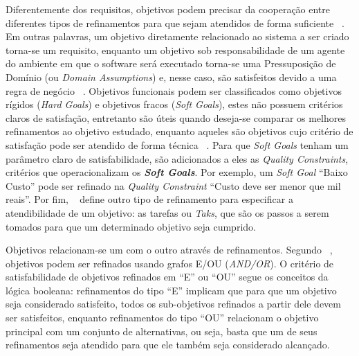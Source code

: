 Diferentemente dos requisitos, objetivos podem precisar da cooperação entre diferentes tipos de refinamentos para que sejam atendidos de forma suficiente ~\cite{dardenne1993goal}. Em outras palavras, um objetivo diretamente relacionado ao sistema a ser criado torna-se um requisito, enquanto um objetivo sob responsabilidade de um agente do ambiente em que o software será executado torna-se uma Pressuposição de Domínio (ou \textit{Domain Assumptions}) e, nesse caso, são satisfeitos devido a uma regra de negócio ~\cite{van2001goal, van1998managing}. Objetivos funcionais podem ser classificados como objetivos rígidos (\textit{Hard Goals}) e objetivos fracos (\textit{Soft Goals}), estes não possuem critérios claros de satisfação, entretanto são úteis quando deseja-se comparar os melhores refinamentos ao objetivo estudado, enquanto aqueles são objetivos cujo critério de satisfação pode ser atendido de forma técnica ~\cite{dardenne1993goal}. Para que \textit{Soft Goals} tenham um parâmetro claro de satisfabilidade, são adicionados a eles as \textit{Quality Constraints}, critérios que operacionalizam os \textit{\textbf{Soft Goals}}. Por exemplo, um \textit{Soft Goal} ``Baixo Custo'' pode ser refinado na \textit{Quality Constraint} ``Custo deve ser menor que mil reais''. Por fim, ~\cite{jureta2008revisiting} define outro tipo de refinamento para especificar a atendibilidade de um objetivo: as tarefas ou \textit{Taks}, que são os passos a serem tomados para que um determinado objetivo seja cumprido. 

Objetivos relacionam-se um com o outro através de refinamentos. Segundo ~\cite{dardenne1991goal, dardenne1993goal}, objetivos podem ser refinados usando grafos E/OU (\textit{AND/OR}). O critério de satisfabilidade de objetivos refinados em ``E'' ou ``OU'' segue os conceitos da lógica booleana: refinamentos do tipo ``E'' implicam que para que um objetivo seja considerado satisfeito, todos os sub-objetivos refinados a partir dele devem ser satisfeitos, enquanto refinamentos do tipo ``OU'' relacionam o objetivo principal com um conjunto de alternativas, ou seja, basta que um de seus refinamentos seja atendido para que ele também seja considerado alcançado.




